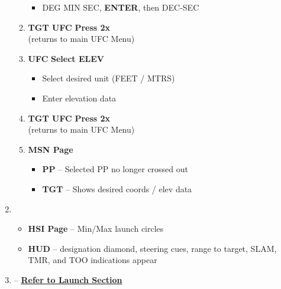 \documentclass[fontInter]{TechCheck}
\begin{document}
\begin{enumerate}[leftmargin=0.1\textwidth, rightmargin=0.1\textwidth, itemsep=4pt, label=\textbf{\arabic*.}]
\begin{enumerate}[itemsep=4pt]
\begin{itemize}
				\item DEG MIN SEC, \textbf{ENTER}, then DEC-SEC
			\end{itemize}
			\item \textbf{TGT UFC} \dotfill \textbf{Press 2x} \\
			\hfill (returns to main UFC Menu)
			\item \textbf{UFC} \dotfill \textbf{Select ELEV}
			\begin{itemize}
				\item Select desired unit (FEET / MTRS)
				\item Enter elevation data
			\end{itemize}
			\item \textbf{TGT UFC} \dotfill \textbf{Press 2x} \\
			\hfill (returns to main UFC Menu)
			\item \textbf{MSN Page}
			\begin{itemize}
				\item \textbf{PP} -- Selected PP no longer crossed out
				\item \textbf{TGT} -- Shows desired coords / elev data 	
			\end{itemize}
		\end{enumerate}
		\item {}
		\begin{itemize}
			\item \textbf{HSI Page} -- Min/Max launch circles
			\item \textbf{HUD} -- designation diamond, steering cues, range to target, SLAM, TMR, and TOO indications appear
		\end{itemize}
		\item {} -- \hyperref[subsec:slamlaunch]{\textbf{Refer to Launch Section}} \\
	\end{enumerate}

	\clearpage
\end{document}
